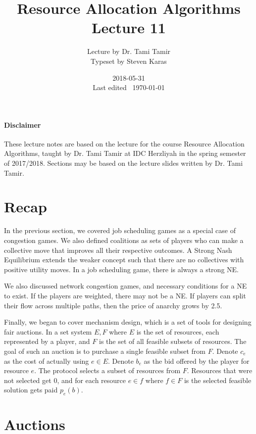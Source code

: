 \documentclass{idc_msc}
\title{Resource Allocation Algorithms\\\large Lecture 11}
\date{2018-05-31 \\ Last edited \currenttime\ \today}
\author{Lecture by Dr. Tami Tamir\\Typeset by Steven Karas}
\begin{document}
\maketitle

\nocite{pinedo2016scheduling}

\paragraph{Disclaimer}

These lecture notes are based on the lecture for the course Resource Allocation Algorithms, taught by Dr. Tami Tamir at IDC Herzliyah in the spring semester of 2017/2018.
Sections may be based on the lecture slides written by Dr. Tami Tamir.

\section{Recap}

In the previous section, we covered job scheduling games as a special case of congestion games.
We also defined coalitions as sets of players who can make a collective move that improves all their respective outcomes.
A Strong Nash Equilibrium extends the weaker concept such that there are no collectives with positive utility moves.
In a job scheduling game, there is always a strong NE.

We also discussed network congestion games, and necessary conditions for a NE to exist.
If the players are weighted, there may not be a NE.
If players can split their flow across multiple paths, then the price of anarchy grows by 2.5.

Finally, we began to cover mechanism design, which is a set of tools for designing fair auctions.
In a set system \(E,F\) where \(E\) is the set of resources, each represented by a player, and \(F\) is the set of all feasible subsets of resources.
The goal of such an auction is to purchase a single feasible subset from \(F\).
Denote \(c_e\) as the cost of actually using \(e \in E\).
Denote \(b_e\) as the bid offered by the player for resource \(e\).
The protocol selects a subset of resources from \(F\).
Resources that were not selected get 0, and for each resource \(e \in f\) where \(f \in F\) is the selected feasible solution gets paid \(p_e(b)\).

\section{Auctions}
\end{document}
